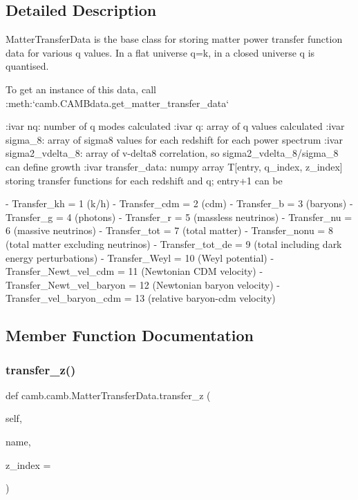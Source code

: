 \subsection{Detailed Description}
\begin{DoxyVerb}MatterTransferData is the base class for storing matter power transfer function data for various q values.
In a flat universe q=k, in a closed universe q is quantised.

To get an instance of this data, call :meth:`camb.CAMBdata.get_matter_transfer_data`

:ivar nq:  number of q modes calculated
:ivar q: array of q values calculated
:ivar sigma_8: array of sigma8 values for each redshift for each power spectrum
:ivar sigma2_vdelta_8: array of v-delta8 correlation, so sigma2_vdelta_8/sigma_8 can define growth
:ivar transfer_data: numpy array T[entry, q_index, z_index] storing transfer functions for each redshift and q; entry+1 can be

        - Transfer_kh = 1 (k/h)
        - Transfer_cdm = 2 (cdm)
        - Transfer_b = 3 (baryons)
        - Transfer_g = 4 (photons)
        - Transfer_r = 5 (massless neutrinos)
        - Transfer_nu = 6 (massive neutrinos)
        - Transfer_tot = 7 (total matter)
        - Transfer_nonu = 8 (total matter excluding neutrinos)
        - Transfer_tot_de = 9 (total including dark energy perturbations)
        - Transfer_Weyl = 10 (Weyl potential)
        - Transfer_Newt_vel_cdm = 11 (Newtonian CDM velocity)
        - Transfer_Newt_vel_baryon = 12 (Newtonian baryon velocity)
        - Transfer_vel_baryon_cdm = 13 (relative baryon-cdm velocity)
\end{DoxyVerb}
 

\subsection{Member Function Documentation}
\mbox{\label{classcamb_1_1camb_1_1MatterTransferData_a6458b95625015d92c9bf21498c2edba8}} 
\subsubsection{\texorpdfstring{transfer\+\_\+z()}{transfer\_z()}}
{\footnotesize\ttfamily def camb.\+camb.\+Matter\+Transfer\+Data.\+transfer\+\_\+z (\begin{DoxyParamCaption}\item[{}]{self,  }\item[{}]{name,  }\item[{}]{z\+\_\+index = {} }\end{DoxyParamCaption})}

